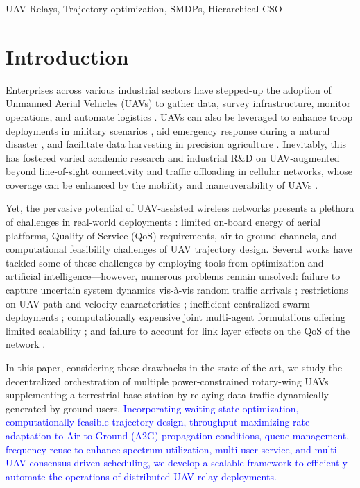 \documentclass[12pt, draftcls, onecolumn]{IEEEtran}
\theoremstyle{plain}
\theoremstyle{definition}
\theoremstyle{remark}
\newcommand\hlt[1]{\textcolor{blue}{#1}}
\begin{document}
\begin{IEEEkeywords}
\begin{center}
    UAV-Relays, Trajectory optimization, SMDPs, Hierarchical CSO
\end{center}
\end{IEEEkeywords}
\vspace{-4mm}

\section{Introduction}\label{S1}
Enterprises across various industrial sectors have stepped-up the adoption of Unmanned Aerial Vehicles (UAVs) to gather data, survey infrastructure, monitor operations, and automate logistics \cite{UAVSurvey, UAVTutorial}.
UAVs can also be leveraged to enhance troop deployments in military scenarios \cite{TCCN}, aid emergency response during a natural disaster \cite{VerizonDisasterRelief}, and facilitate data harvesting in precision agriculture \cite{VerizonAgriculture}. Inevitably, this has fostered varied academic research and industrial R\&D on UAV-augmented beyond line-of-sight connectivity and traffic offloading in cellular networks, whose coverage can be enhanced by the mobility and maneuverability of UAVs \cite{LOSDominance, FundamentalTradeoffs}. 

Yet, the pervasive potential of UAV-assisted wireless networks presents a plethora of challenges in real-world deployments \cite{FundamentalTradeoffs}: limited on-board energy of aerial platforms, Quality-of-Service (QoS) requirements, air-to-ground channels, and computational feasibility challenges of UAV trajectory design. Several works have tackled some of these challenges by employing tools from optimization and artificial intelligence---however, numerous problems remain unsolved: failure to capture uncertain system dynamics vis-\`{a}-vis random traffic arrivals \cite{SCA, PAoI, MEC-CVX, LoSMap, Rician}; restrictions on UAV path and velocity characteristics \cite{PSOPathStructure, PAoI}; inefficient centralized swarm deployments \cite{CSCA-ADMM, JointTrajectoryDesign, MultiDroneDeployment}; computationally expensive joint multi-agent formulations offering limited scalability \cite{DDQN, MEC-DDPG, DQNPositioning, MLDeployment}; and failure to account for link layer effects on the QoS of the network \cite{GameTheory, UAVDynamicCoverage}.

In this paper, considering these drawbacks in the state-of-the-art, we study the decentralized orchestration of multiple power-constrained rotary-wing UAVs supplementing a terrestrial base station by relaying data traffic dynamically generated by ground users. \hlt{Incorporating waiting state optimization, computationally feasible trajectory design, throughput-maximizing rate adaptation to Air-to-Ground (A2G) propagation conditions, queue management, frequency reuse to enhance spectrum utilization, multi-user service, and multi-UAV consensus-driven scheduling, we develop a scalable framework to efficiently automate the operations of distributed UAV-relay deployments.}
\end{document}

